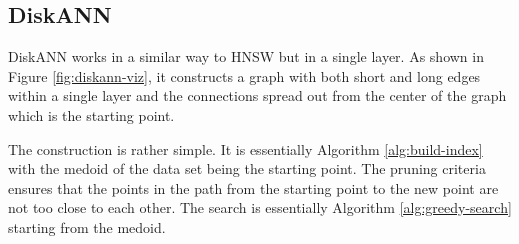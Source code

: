 
\subsection{DiskANN}

DiskANN works in a similar way to HNSW but in a single layer. As shown in Figure \ref{fig:diskann-viz}, it constructs a graph with both short and long edges within a single layer and the connections spread out from the center of the graph which is the starting point.

The construction is rather simple. It is essentially Algorithm \ref{alg:build-index} with the medoid of the data set being the starting point. The pruning criteria ensures that the points in the path from the starting point to the new point are not too close to each other. The search is essentially Algorithm \ref{alg:greedy-search} starting from the medoid.




